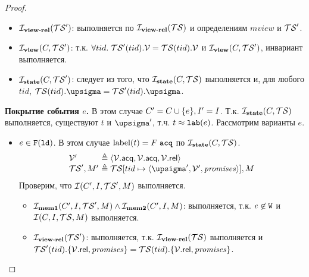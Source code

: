 \begin{proof}
\begin{itemize}
        \item $\mathcal{I}_{\rm \bf view\text{-}rel}(\mathcal{TS}')$: выполняется по $\mathcal{I}_{\rm \bf view\text{-}rel}(\mathcal{TS})$ и определениям $mview$ и $\mathcal{TS}'$.

        \item $\mathcal{I}_{\rm \bf view}(C, \mathcal{TS}')$: т.к. $\forall tid. \; \mathcal{TS}'(tid).\mathcal{V} = \mathcal{TS}(tid).\mathcal{V}$ и $\mathcal{I}_{\rm \bf view}(C, \mathcal{TS}')$,
          инвариант выполняется.

        \item $\mathcal{I}_{\rm \bf state}(C, \mathcal{TS}')$:
          следует из того, что $\mathcal{I}_{\rm \bf state}(C, \mathcal{TS})$ выполняется и, для любого $tid$, $\TSf(tid).\pstate = \TSf'(tid).\pstate$.
      \end{itemize}

  
  {\bf Покрытие события $e$.} В этом случае $C' = C \cup \{e\}, I' = I$.
      Т.к. $\mathcal{I}_{\rm \bf state}(C, \mathcal{TS})$ выполняется, существуют $t$ и $\pstate'$, т.ч. $t \approx {\mathtt{lab}}(e)$.
      Рассмотрим варианты $e$.
      \begin{itemize}
        \item $e \in {{\mathtt{F}}}(\mathtt{ld})$.
          В этом случае ${\rm label}(t) = F \; {\mathtt{acq}}$ по $\mathcal{I}_{\rm \bf state}(C, \mathcal{TS})$.
          \[\begin{array}{l@{~}l}
            \View'    & \defeq \tup{\View.\viewAcq, \View.\viewAcq, \View.\viewRel} \\
            \TSf', M' & \defeq \TSf[tid \mapsto \tup{\pstate', \View', \PromSet}], M \\
          \end{array}\]
      Проверим, что $\mathcal{I}(C', I, \mathcal{TS}', M)$ выполняется.
      \begin{itemize}
        \item $\mathcal{I}_{\rm \bf mem1}(C', I, \mathcal{TS}', M) \land \mathcal{I}_{\rm \bf mem2}(C', I, M)$:
          выполняется, т.к. $e \not\in {\mathtt{W}}$ и $\mathcal{I}(C, I, \mathcal{TS}, M)$ выполняется.

        \item $\mathcal{I}_{\rm \bf view\text{-}rel}(\mathcal{TS}')$: выполняется, т.к. $\mathcal{I}_{\rm \bf view\text{-}rel}(\mathcal{TS})$ выполняется и\\
          $\mathcal{TS}'(tid).\{\mathcal{V}.{\sf rel}, \mathit{promises}\} = \mathcal{TS}(tid).\{\mathcal{V}.{\sf rel}, \mathit{promises}\}$.


\end{itemize}
\end{itemize}
\end{proof}
